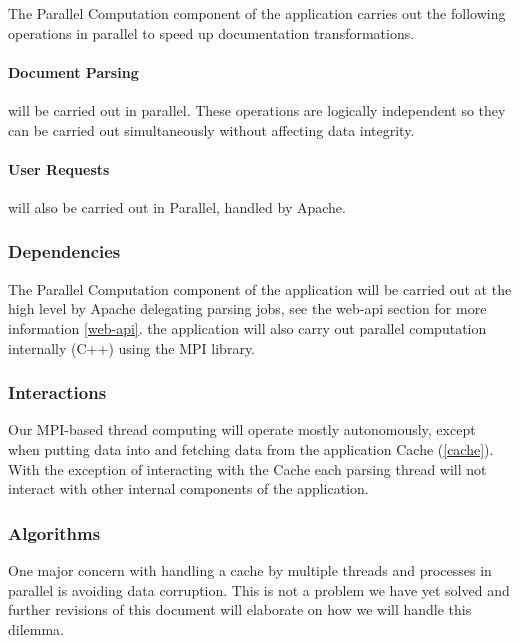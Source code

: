 The Parallel Computation component of the application carries out the following operations in parallel to speed up documentation transformations.

\paragraph{Document Parsing} will be carried out in parallel.
These operations are logically independent so they can be carried out simultaneously without affecting data integrity.

\paragraph{User Requests} will also be carried out in Parallel, handled by Apache.

\subsubsection{Dependencies}

The Parallel Computation component of the application will be carried out at the high level by Apache delegating parsing jobs, see the \gls{web-api} section for more information \ref{web-api}.
the application will also carry out parallel computation internally (C++) using the MPI library.

\subsubsection{Interactions}

Our MPI-based thread computing will operate mostly autonomously, except when putting data into and fetching data from the application Cache (\ref{cache}).
With the exception of interacting with the Cache each parsing thread will not interact with other internal components of the application.

\subsubsection{Algorithms}

One major concern with handling a cache by multiple threads and processes in parallel is avoiding data corruption.
This is not a problem we have yet solved and further revisions of this document will elaborate on how we will handle this dilemma.

